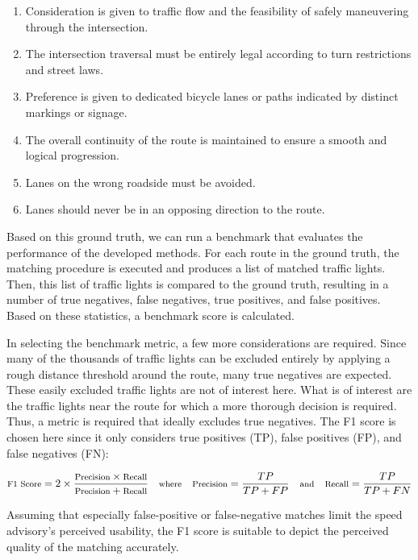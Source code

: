 \begin{enumerate}
\item Consideration is given to traffic flow and the feasibility of safely maneuvering through the intersection.
\item The intersection traversal must be entirely legal according to turn restrictions and street laws.
\item Preference is given to dedicated bicycle lanes or paths indicated by distinct markings or signage.
\item The overall continuity of the route is maintained to ensure a smooth and logical progression.
\item Lanes on the wrong roadside must be avoided.
\item Lanes should never be in an opposing direction to the route.
\end{enumerate}

Based on this ground truth, we can run a benchmark that evaluates the performance of the developed methods. For each route in the ground truth, the matching procedure is executed and produces a list of matched traffic lights. Then, this list of traffic lights is compared to the ground truth, resulting in a number of true negatives, false negatives, true positives, and false positives. Based on these statistics, a benchmark score is calculated.

In selecting the benchmark metric, a few more considerations are required. Since many of the thousands of traffic lights can be excluded entirely by applying a rough distance threshold around the route, many true negatives are expected. These easily excluded traffic lights are not of interest here. What is of interest are the traffic lights near the route for which a more thorough decision is required. Thus, a metric is required that ideally excludes true negatives. The F1 score is chosen here since it only considers true positives (TP), false positives (FP), and false negatives (FN): 

\begin{equation}
\text{\footnotesize F1 Score} = 2 \times \frac{\text{\footnotesize Precision} \times \text{\footnotesize Recall}}{\text{\footnotesize Precision} + \text{\footnotesize Recall}} \quad \text{\footnotesize where} \quad \text{\footnotesize Precision} = \frac{TP}{TP + FP} \quad \text{\footnotesize and} \quad \text{\footnotesize Recall} = \frac{TP}{TP + FN}
\end{equation}

Assuming that especially false-positive or false-negative matches limit the speed advisory's perceived usability, the F1 score is suitable to depict the perceived quality of the matching accurately.


